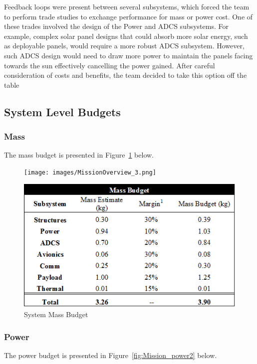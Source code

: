 \documentclass[12pt]{article}
\begin{document}
Feedback loops were present between several subsystems, which forced the team to perform trade studies to exchange performance for mass or power cost. One of these trades involved the design of the Power and ADCS subsystems. For example, complex solar panel designs that could absorb more solar energy, such as deployable panels, would require a more robust ADCS subsystem. However, such ADCS design would need to draw more power to maintain the panels facing towards the sun effectively cancelling the power gained. After careful consideration of costs and benefits, the team decided to take this option off the table
	
	\subsection{System Level Budgets}
		\subsubsection{Mass}
		The mass budget is presented in Figure~\ref{fig:Mission_mass2} below.
		
			\begin{figure}[!ht]
				\centering
				\texttt{[image: images/MissionOverview\_3.png]}
				
				\includegraphics[width=5in]{images/MissionOverview_5.png}
				\caption{System Mass Budget}
				\label{fig:Mission_mass2}
			\end{figure}
			
		\subsubsection{Power}
		The power budget is presented in Figure~\ref{fig:Mission_power2} below.
			
\end{document}
